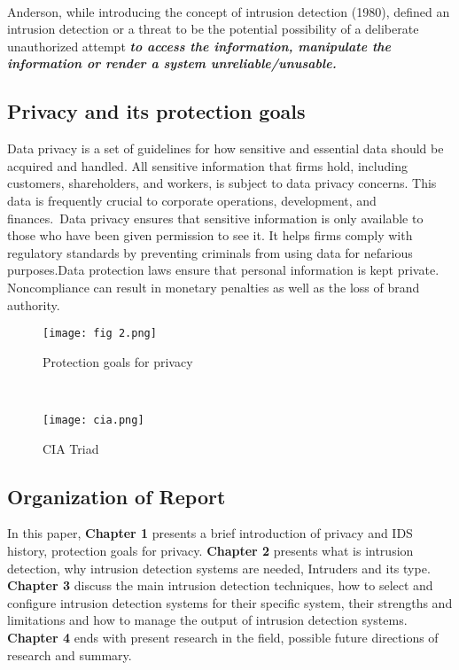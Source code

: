 \documentclass[12pt]{article}
\begin{document}
    \clearpage
    \\
    \par Anderson, while introducing the concept of intrusion detection (1980), defined an intrusion detection or a threat to be the potential possibility of a deliberate unauthorized attempt \textbf{\textit{to access the information, manipulate the information or render a system unreliable/unusable.}}
    \\
    \subsection{Privacy and its protection goals}
    \par Data privacy is a set of guidelines for how sensitive and essential data should be acquired and handled. All sensitive information that firms hold, including customers, shareholders, and workers, is subject to data privacy concerns. This data is frequently crucial to corporate operations, development, and finances. Data privacy ensures that sensitive information is only available to those who have been given permission to see it. It helps firms comply with regulatory standards by preventing criminals from using data for nefarious purposes.Data protection laws ensure that personal information is kept private. Noncompliance can result in monetary penalties as well as the loss of brand authority.
    \\
    
    \begin{figure}[h]
        \centering
        \texttt{[image: fig 2.png]}
        \caption{Protection goals for privacy}
    \end{figure}
    \\
    
    \begin{figure}[h]
        \centering
        \texttt{[image: cia.png]}
        \caption{CIA Triad}
    \end{figure}
    
    \subsection{Organization of Report}
    \par In this paper, \textbf{Chapter 1} presents a brief introduction of privacy and IDS history, protection goals for privacy. \textbf{Chapter 2} presents what is intrusion detection, why intrusion detection systems are needed, Intruders and its type. \textbf{Chapter 3} discuss the main intrusion detection techniques, how to select and configure intrusion detection systems for their specific system, their strengths and limitations and how to manage the output of intrusion detection systems. \textbf{Chapter 4} ends with present research in the field, possible future directions of research and summary.
    \\
    \clearpage
    
\end{document}
